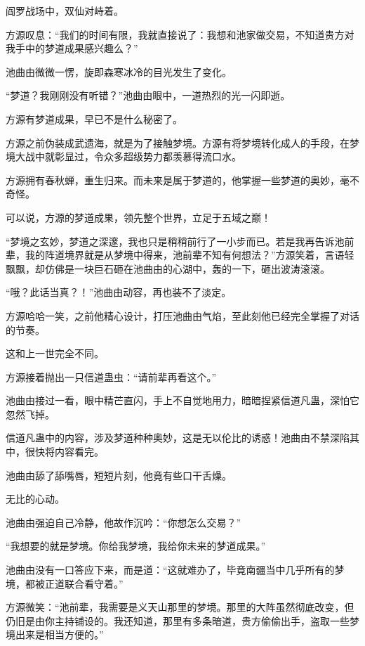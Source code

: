 
\begin{this_body}



阎罗战场中，双仙对峙着。

方源叹息：“我们的时间有限，我就直接说了：我想和池家做交易，不知道贵方对我手中的梦道成果感兴趣么？”

池曲由微微一愣，旋即森寒冰冷的目光发生了变化。

“梦道？我刚刚没有听错？”池曲由眼中，一道热烈的光一闪即逝。

方源有梦道成果，早已不是什么秘密了。

方源之前伪装成武遗海，就是为了接触梦境。方源有将梦境转化成人的手段，在梦境大战中就彰显过，令众多超级势力都羡慕得流口水。

方源拥有春秋蝉，重生归来。而未来是属于梦道的，他掌握一些梦道的奥妙，毫不奇怪。

可以说，方源的梦道成果，领先整个世界，立足于五域之巅！

“梦境之玄妙，梦道之深邃，我也只是稍稍前行了一小步而已。若是我再告诉池前辈，我的阵道境界就是从梦境中得来，池前辈不知有何想法？”方源笑着，言语轻飘飘，却仿佛是一块巨石砸在池曲由的心湖中，轰的一下，砸出波涛滚滚。

“哦？此话当真？！”池曲由动容，再也装不了淡定。

方源哈哈一笑，之前他精心设计，打压池曲由气焰，至此刻他已经完全掌握了对话的节奏。

这和上一世完全不同。

方源接着抛出一只信道蛊虫：“请前辈再看这个。”

池曲由接过一看，眼中精芒直闪，手上不自觉地用力，暗暗捏紧信道凡蛊，深怕它忽然飞掉。

信道凡蛊中的内容，涉及梦道种种奥妙，这是无以伦比的诱惑！池曲由不禁深陷其中，很快将内容看完。

池曲由舔了舔嘴唇，短短片刻，他竟有些口干舌燥。

无比的心动。

池曲由强迫自己冷静，他故作沉吟：“你想怎么交易？”

“我想要的就是梦境。你给我梦境，我给你未来的梦道成果。”

池曲由没有一口答应下来，而是道：“这就难办了，毕竟南疆当中几乎所有的梦境，都被正道联合看守着。”

方源微笑：“池前辈，我需要是义天山那里的梦境。那里的大阵虽然彻底改变，但仍旧是由你主持铺设的。我还知道，那里有多条暗道，贵方偷偷出手，盗取一些梦境出来是相当方便的。”


\end{this_body}
